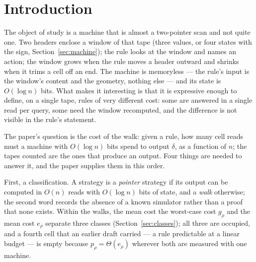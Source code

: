 \documentclass[11pt]{article}
\theoremstyle{remark}
\begin{document}
\begin{abstract}
We then show why two standard lower-bound techniques fail. The device's answer is one of eight actions, so no information
argument can force more than $1.893$ reads per query; and no certificate argument can force more
than $n$ reads, because certificates do not compose --- on one tape the per-query certificates sum
to $1\,285\,703$ cells while their union has $1\,020$. Finally, a bound proved for the rule's output does not bound the walk directly. The walk's cost is
the output's cost multiplied by the fraction $f(n)$ of queries at which one answer can change the
action: the machine pays only for those queries. Measured, $f=0.104$ at $n=128$ and $f$ falls like
$n^{-0.99}$, so an output bound of slope $s$ appears as a walk bound of slope $s-0.99$ --- which is
why class-restricted bounds restated for the walk carry slopes near $2$ rather than $3$.
\end{abstract}

\section{Introduction}

The object of study is a machine that is almost a two-pointer scan and not quite one. Two headers
enclose a window of that tape (three values, or four states with the sign, Section~\ref{sec:machine});
the rule looks at the window and names an action; the
window grows when the rule moves a header outward and shrinks when it trims a cell off an end. The
machine is memoryless --- the rule's input is the window's content and the geometry, nothing else ---
and its state is $O(\log n)$ bits. What makes it interesting is that it is expressive enough to
define, on a single tape, rules of very different cost: some are answered in a single read per query,
some need the window recomputed, and the difference is not visible in the rule's statement.

The paper's question is the cost of the walk: given a rule, how many cell reads must a machine with
$O(\log n)$ bits spend to output $\delta$, as a function of $n$; the tapes counted are the ones that produce an output. Four things are needed
to answer it, and the paper supplies them in this order.

First, a classification. A strategy is a \emph{pointer} strategy if its output can be computed in
$O(n)$ reads with $O(\log n)$ bits of state, and a \emph{walk} otherwise; the second word records the
absence of a known simulator rather than a proof that none exists. Within the walks, the mean cost
the worst-case cost $g_{\rho}$ and the mean cost $e_{\rho}$ separate three classes
(Section~\ref{sec:classes}); all three are occupied, and a fourth cell that an earlier draft carried
--- a rule predictable at a linear budget --- is empty because $p_{\rho}=\Theta(e_{\rho})$ wherever
both are measured with one machine.
\end{document}

